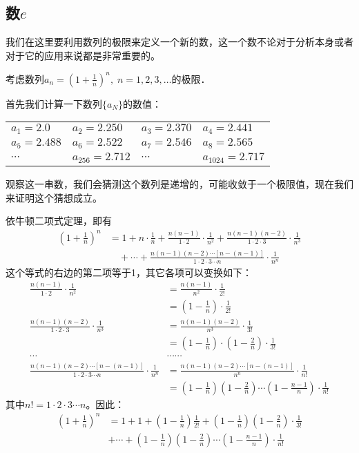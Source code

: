\subsection{数$e$}
我们在这里要利用数列的极限来定义一个新的数，这一个数不论对于分析本身或者对于它的应用来说都是非常重要的。

考虑数列$a_n=\left(1+\frac{1}{n}\right)^n,\; n=1, 2, 3,\ldots$的极限．

首先我们计算一下数列$\{a_N\}$的数值：
\begin{center}
\begin{tabular}{llll}
   $a_1=2.0$ & $a_2=2.250$ & $a_3=2.370$& $a_4=2.441$\\
$a_5=2.488$ &$a_6=2.522$& $a_7=2.546$& $a_8=2.565$\\
$\cdots$ &$a_{256}=2.712$&$\cdots$&$a_{1024}=2.717$\\ 
\end{tabular}
\end{center}

观察这一串数，我们会猜测这个数列是递增的，可能收敛于一个极限值，现在我们来证明这个猜想成立。

依牛顿二项式定理，即有
\[\begin{split}
    \left(1+\frac{1}{n}\right)^n&=1+n\cdot\frac{1}{n}+\frac{n(n-1)}{1\cdot 2}\cdot \frac{1}{n^2}+\frac{n(n-1)(n-2)}{1\cdot 2\cdot 3}\cdot \frac{1}{n^3}\\
    &\quad +\cdots+\frac{n(n-1)(n-2)\cdots[n-(n-1)]}{1\cdot 2\cdot 3\cdots n}\cdot \frac{1}{n^n}
\end{split}\]
这个等式的右边的第二项等于1，其它各项可以变换如下：
\[\begin{split}
\frac{n(n-1)}{1\cdot 2}\cdot \frac{1}{n^2}&=\frac{n(n-1)}{n^2}\cdot\frac{1}{2!}\\&=\left(1-\frac{1}{n}\right) \cdot\frac{1}{2!}\\
\frac{n(n-1)(n-2)}{1\cdot 2\cdot 3}\cdot \frac{1}{n^3}&=\frac{n(n-1)(n-2)}{n^3}\cdot\frac{1}{3!}\\&=\left(1-\frac{1}{n}\right)\cdot \left(1-\frac{2}{n}\right)\cdot\frac{1}{3!}\\
\cdots & \cdots\cdots\\
\frac{n(n-1)(n-2)\cdots[n-(n-1)]}{1\cdot 2\cdot 3\cdots n}\cdot \frac{1}{n^n}&=\frac{n(n-1)(n-2)\cdots[n-(n-1)]}{n^n}\cdot \frac{1}{n!}\\
&=\left(1-\frac{1}{n}\right) \left(1-\frac{2}{n}\right)\cdots\left(1-\frac{n-1}{n}\right)\cdot\frac{1}{n!}
\end{split}\]
其中$n!=1\cdot 2\cdot 3\cdots n$。因此：
\begin{equation}
\begin{split}
\left(1+\frac{1}{n}\right)^n&=1+1+\left(1-\frac{1}{n}\right)\frac{1}{2!}+ \left(1-\frac{1}{n}\right)\left(1-\frac{2}{n}\right)\cdot\frac{1}{3!}\\
&+\cdots+ \left(1-\frac{1}{n}\right) \left(1-\frac{2}{n}\right)\cdots\left(1-\frac{n-1}{n}\right)\cdot\frac{1}{n!}  
\end{split}
\end{equation}

